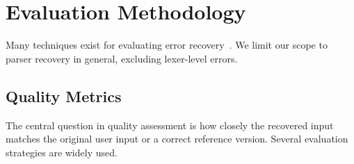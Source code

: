\documentclass[conference]{IEEEtran}
\begin{document}
\section{Evaluation Methodology}

Many techniques exist for evaluating error recovery~\cite{recovery-types}. We limit our scope to parser recovery in general, excluding lexer-level errors.

\subsection{Quality Metrics}

The central question in quality assessment is how closely the recovered input matches the original user input or a correct reference version. Several evaluation strategies are widely used.
\end{document}
